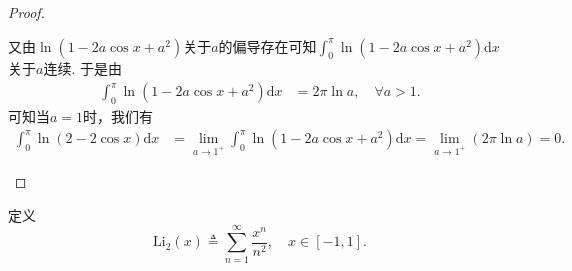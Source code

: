 \documentclass[../../main.tex]{subfiles}
\begin{document}
\begin{proof}
\begin{enumerate}
又由\(\ln(1 - 2a\cos x + a^2)\)关于\(a\)的偏导存在可知\(\int_0^{\pi} \ln(1 - 2a\cos x + a^2) \mathrm{d}x\)关于\(a\)连续. 于是由
\\
\begin{align*}
\int_0^{\pi} \ln(1 - 2a\cos x + a^2) \mathrm{d}x &= 2\pi \ln a, \quad \forall a > 1.
\end{align*}
可知当\(a = 1\)时，我们有
\\
\begin{align*}
\int_0^{\pi} \ln(2 - 2\cos x) \mathrm{d}x &= \lim_{a \to 1^+} \int_0^{\pi} \ln(1 - 2a\cos x + a^2) \mathrm{d}x = \lim_{a \to 1^+} (2\pi \ln a) = 0.
\end{align*} 
\end{enumerate}

\end{proof}

\begin{definition}
定义  
\[
\mathrm{Li}_2(x) \triangleq \sum_{n=1}^{\infty} \frac{x^n}{n^2}, \quad x \in [-1,1].
\] 
\end{definition}
\end{document}
